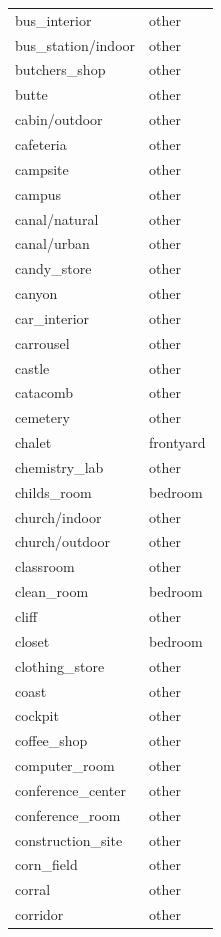 \begin{table}[h!]
\begin{tabular}{| l | l |}
		bus\_interior &        other \\
		bus\_station/indoor &        other \\
		butchers\_shop &        other \\
		butte &        other \\
		cabin/outdoor &        other \\
		cafeteria &        other \\
		campsite &        other \\
		campus &        other \\
		canal/natural &        other \\
		canal/urban &        other \\
		candy\_store &        other \\
		canyon &        other \\
		car\_interior &        other \\
		carrousel &        other \\
		castle &        other \\
		catacomb &        other \\
		cemetery &        other \\
		chalet &    frontyard \\
		chemistry\_lab &        other \\
		childs\_room &      bedroom \\
		church/indoor &        other \\
		church/outdoor &        other \\
		classroom &        other \\
		clean\_room &      bedroom \\
		cliff &        other \\
		closet &      bedroom \\
		clothing\_store &        other \\
		coast &        other \\
		cockpit &        other \\
		coffee\_shop &        other \\
		computer\_room &        other \\
		conference\_center &        other \\
		conference\_room &        other \\
		construction\_site &        other \\
		corn\_field &        other \\
		corral &        other \\
		corridor &        other \\

\end{tabular}
\end{table}
